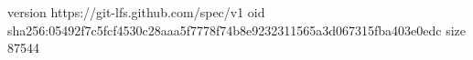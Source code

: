 version https://git-lfs.github.com/spec/v1
oid sha256:05492f7c5fcf4530c28aaa5f7778f74b8e9232311565a3d067315fba403e0edc
size 87544
